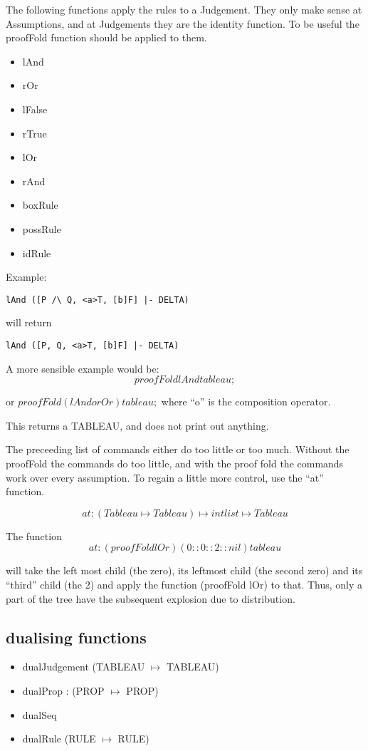 \documentclass[12pt]{article}
\begin{document}
The following functions apply the rules to a Judgement.
They only make sense at Assumptions, and at Judgements
they are the identity function.  To be useful
the proofFold function should be applied to them.

\begin{itemize}
\item lAnd
\item rOr
\item lFalse
\item rTrue
\item lOr
\item rAnd
\item boxRule
\item possRule
\item idRule
\end{itemize}


Example:

\begin{verbatim}
lAnd ([P /\ Q, <a>T, [b]F] |- DELTA)
\end{verbatim}
will return
\begin{verbatim}
lAnd ([P, Q, <a>T, [b]F] |- DELTA)
\end{verbatim}

A more sensible example would be:
$$ proofFold lAnd tableau; $$

or $proofFold (lAnd o rOr) tableau;$
where ``o'' is the composition operator.

This returns a TABLEAU, and does not print out anything.

The preceeding list of commands either do too little or too much.
Without the proofFold the commands do too little, and with
the proof fold the commands work over every assumption.
To regain a little more control, use the ``at'' function.


$$at : (Tableau \mapsto Tableau) \mapsto int list \mapsto Tableau$$

The function $$at : (proofFold lOr) (0::0::2::nil) tableau$$

will take the left most child (the zero), its leftmost child (the second zero)
and its ``third'' child (the 2) and apply the function (proofFold lOr)
to that.  Thus, only a part of the tree have the subsequent explosion
due to distribution.

\subsection{dualising functions}

\begin{itemize}
\item dualJudgement (TABLEAU $\mapsto$ TABLEAU)
\item dualProp : (PROP $\mapsto$ PROP)
\item dualSeq
\item dualRule	(RULE $\mapsto$ RULE)
\end{itemize}
\end{document}
